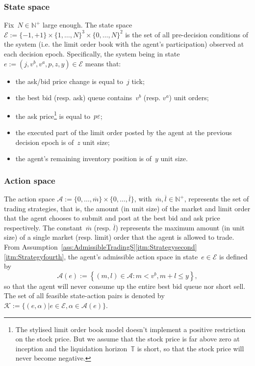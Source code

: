 \documentclass{amsart}[11pt]
\numberwithin{equation}{section}
\theoremstyle{definition}
\newcommand{\NN}{\mathbb{N}}
\newcommand{\Kk}{\mathcal{K}}
\newcommand{\Ee}{\mathcal{E}}
\newcommand{\eps}{\varepsilon}
\newcommand{\TT}{\mathbb{T}}
\newcommand{\Aa}{\mathcal{A}}
\begin{document}
\subsubsection{State space}
Fix~$N\in\NN^+$ large enough.
The state space~$\Ee:= \{-1, +1\}\times\{1, \dots, N\}^3\times\{0, \dots, N\}^2$
is the set of all pre-decision conditions of the system
(i.e. the limit order book with the agent's participation)
observed at each decision epoch.
Specifically, the system being in state~$e := (j, v^b, v^a, p, z, y) \in \Ee$ means that: 
\begin{itemize}
\item the ask/bid price change is equal to~$j$ tick;
\item the best bid (resp. ask) queue contains~$v^b$ (resp. $v^a$) unit orders;
\item the ask price\footnote{The stylised limit order book model doesn't implement a positive restriction on the stock price.
But we assume that the stock price is far above zero at inception
and the liquidation horizon~$\TT$ is short,
so that the stock price will never become negative.} is equal to~$p\eps$;
\item the executed part of the limit order posted by the agent at the previous decision epoch is of~$z$ unit size;
\item the agent's remaining inventory position is of~$y$ unit size.  
\end{itemize}

\subsubsection{Action space}\label{sec:actionspace}
The action space ${\Aa} := \{0, \dots, \overline{m}\}\times\{0, \dots, \overline{l}\}$, 
with~$\overline{m}, \overline{l}\in\NN^+$,
represents the set of trading strategies, that is,
the amount (in unit size) of the market and limit order that the agent chooses to submit and post at the best bid and ask price respectively.
The constant~$\overline{m}$ (resp. $\overline{l}$)
represents the maximum amount (in unit size) of a single market (resp. limit) order that the agent is allowed to trade. 
From Assumption~\ref{ass:AdmissibleTradingS}\eqref{itm:Strategysecond}\eqref{itm:Strategyfourth},
the agent's admissible action space in state~$e \in \Ee$ is defined by
\begin{equation}\label{def:actionspace}
{\Aa}(e) := \left\{(m, l)\in {\Aa}: m < v^b, m + l \leq y\right\},
\end{equation}
so that the agent will never consume up the entire best bid queue nor short sell. 
The set of all feasible state-action pairs is denoted by~$\Kk:=\{(e, \alpha) | e\in \Ee, \alpha\in\Aa(e)\}$.
\end{document}
